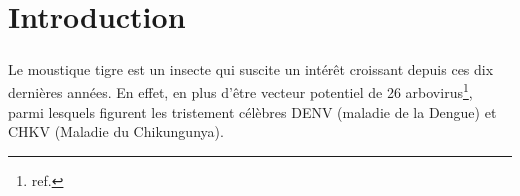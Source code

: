 \chapter{Introduction}

\paragraph{}

Le moustique tigre  est un insecte qui suscite un intérêt croissant depuis ces dix dernières années.
En effet, en plus d'être vecteur potentiel de 26 arbovirus\footnote{ref.}, parmi lesquels figurent les tristement célèbres DENV (maladie de la Dengue) et CHKV (Maladie du Chikungunya).